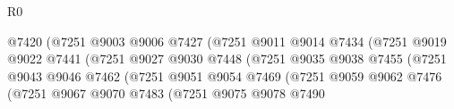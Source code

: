 \begin{lexlean}{R0}
\begin{coremodule}
                                                @7420
                                                (@7251
                                                  @9003
                                                  @9006
                                                  @7427
                                                  (@7251
                                                    @9011
                                                    @9014
                                                    @7434
                                                    (@7251
                                                      @9019
                                                      @9022
                                                      @7441
                                                      (@7251
                                                        @9027
                                                        @9030
                                                        @7448
                                                        (@7251
                                                          @9035
                                                          @9038
                                                          @7455
                                                          (@7251
                                                            @9043
                                                            @9046
                                                            @7462
                                                            (@7251
                                                              @9051
                                                              @9054
                                                              @7469
                                                              (@7251
                                                                @9059
                                                                @9062
                                                                @7476
                                                                (@7251
                                                                  @9067
                                                                  @9070
                                                                  @7483
                                                                  (@7251
                                                                    @9075
                                                                    @9078
                                                                    @7490

\end{coremodule}
\end{lexlean}
